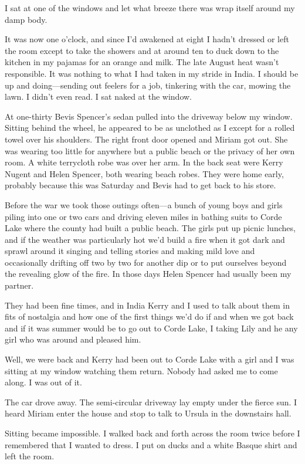 \documentclass{novel}
\begin{document}
I sat at one of the windows and let what breeze there was wrap itself around my damp body.

It was now one o’clock, and since I’d awakened at eight I hadn’t dressed or left the room except to take the showers and at around ten to duck down to the kitchen in my pajamas for an orange and milk. The late August heat wasn’t responsible. It was nothing to what I had taken in my stride in India. I should be up and doing—sending out feelers for a job, tinkering with the car, mowing the lawn. I didn’t even read. I sat naked at the window.

At one-thirty Bevis Spencer’s sedan pulled into the driveway below my window. Sitting behind the wheel, he appeared to be as unclothed as I except for a rolled towel over his shoulders. The right front door opened and Miriam got out. She was wearing too little for anywhere but a public beach or the privacy of her own room. A white terrycloth robe was over her arm. In the back seat were Kerry Nugent and Helen Spencer, both wearing beach robes. They were home early, probably because this was Saturday and Bevis had to get back to his store.

Before the war we took those outings often—a bunch of young boys and girls piling into one or two cars and driving eleven miles in bathing suits to Corde Lake where the county had built a public beach. The girls put up picnic lunches, and if the weather was particularly hot we’d build a fire when it got dark and sprawl around it singing and telling stories and making mild love and occasionally drifting off two by two for another dip or to put ourselves beyond the revealing glow of the fire. In those days Helen Spencer had usually been my partner.

They had been fine times, and in India Kerry and I used to talk about them in fits of nostalgia and how one of the first things we’d do if and when we got back and if it was summer would be to go out to Corde Lake, I taking Lily and he any girl who was around and pleased him.

Well, we were back and Kerry had been out to Corde Lake with a girl and I was sitting at my window watching them return. Nobody had asked me to come along. I was out of it.

The car drove away. The semi-circular driveway lay empty under the fierce sun. I heard Miriam enter the house and stop to talk to Ursula in the downstairs hall.

Sitting became impossible. I walked back and forth across the room twice before I remembered that I wanted to dress. I put on ducks and a white Basque shirt and left the room.
\end{document}
